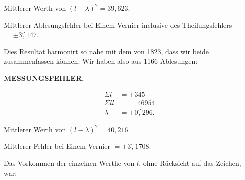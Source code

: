 \par\noindent\hspace*{\parindent}Mittlerer Werth von $(l-\lambda)^2=39{,}623$.
\par\noindent\hspace*{\parindent}Mittlerer Ablesungsfehler bei Einem Vernier inclusive des Theilungsfehlers $=\pm3\overset{\prime\prime}{,}147$.
\par\bigskip\bigskip
\par\noindent\hspace*{\parindent}Dies Resultat harmonirt so nahe mit dem von 1823, dass wir beide zusammenfassen können. Wir haben also aus 1166 Ablesungen:

\par\clearpage
\noindent\null\hfill{\small\textbf{MESSUNGSFEHLER.}}\hfill{}\par\medskip
\[
\begin{aligned}
\Sigma l&=+345\\
\Sigma ll&=\phantom{+}46954\\
\lambda&=+0\overset{\prime\prime}{,}296.
\end{aligned}
\]
\par\noindent\hspace*{\parindent}Mittlerer Werth von $(l-\lambda)^2=40{,}216$.
\par\noindent\hspace*{\parindent}Mittlerer Fehler bei Einem Vernier $=\pm3\overset{\prime\prime}{,}1708$.
\par\noindent\hspace*{\parindent}Das Vorkommen der einzelnen Werthe von $l$, ohne Rücksicht auf das Zeichen, war:
